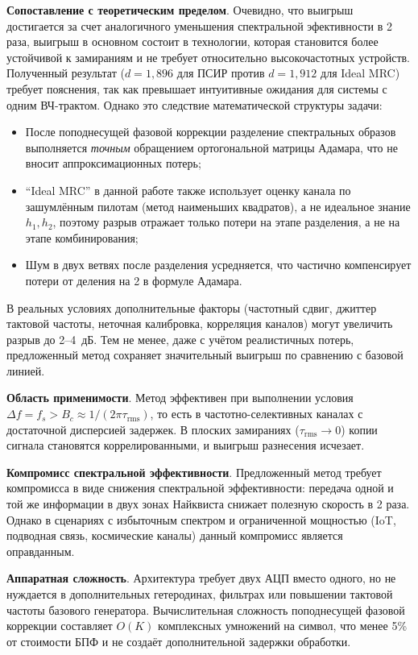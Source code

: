 \documentclass[a4paper,12pt]{article}
\numberwithin{equation}{section}
\begin{document}
\textbf{Сопоставление с теоретическим пределом}. 
Очевидно, что выигрыш достигается за счет аналогичного уменьшения спектральной эфективности в 2 раза, выигрыш в основном состоит в технологии, которая становится более устойчивой к замираниям и не требует относительно высокочастотных устройств. Полученный результат ($d = 1{,}896$ для ПСИР против $d = 1{,}912$ для Ideal MRC) 
требует пояснения, так как превышает интуитивные ожидания для системы с одним ВЧ-трактом. 
Однако это следствие математической структуры задачи:
\begin{itemize}
    \item После поподнесущей фазовой коррекции разделение спектральных образов 
    выполняется \textit{точным} обращением ортогональной матрицы Адамара, 
    что не вносит аппроксимационных потерь;
    \item ``Ideal MRC'' в данной работе также использует оценку канала по зашумлённым 
    пилотам (метод наименьших квадратов), а не идеальное знание $h_1, h_2$, 
    поэтому разрыв отражает только потери на этапе разделения, а не на этапе комбинирования;
    \item Шум в двух ветвях после разделения усредняется, что частично компенсирует 
    потери от деления на 2 в формуле Адамара.
\end{itemize}
В реальных условиях дополнительные факторы (частотный сдвиг, джиттер тактовой частоты, 
неточная калибровка, корреляция каналов) могут увеличить разрыв до 2--4~дБ. 
Тем не менее, даже с учётом реалистичных потерь, предложенный метод сохраняет значительный выигрыш по сравнению с базовой линией.

\textbf{Область применимости}. Метод эффективен при выполнении условия $\Delta f = f_s > B_c \approx 1/(2\pi\tau_\text{rms})$, то есть в частотно-селективных каналах с достаточной дисперсией задержек. В плоских замираниях ($\tau_\text{rms} \to 0$) копии сигнала становятся коррелированными, и выигрыш разнесения исчезает.

\textbf{Компромисс спектральной эффективности}. Предложенный метод требует компромисса в виде снижения спектральной эффективности: передача одной и той же информации в двух зонах Найквиста снижает полезную скорость в 2 раза. Однако в сценариях с избыточным спектром и ограниченной мощностью (IoT, подводная связь, космические каналы) данный компромисс является оправданным.

\textbf{Аппаратная сложность}. Архитектура требует двух АЦП вместо одного, но не нуждается в дополнительных гетеродинах, фильтрах или повышении тактовой частоты базового генератора. Вычислительная сложность поподнесущей фазовой коррекции составляет $O(K)$ комплексных умножений на символ, что менее 5\% от стоимости БПФ и не создаёт дополнительной задержки обработки.
\end{document}
